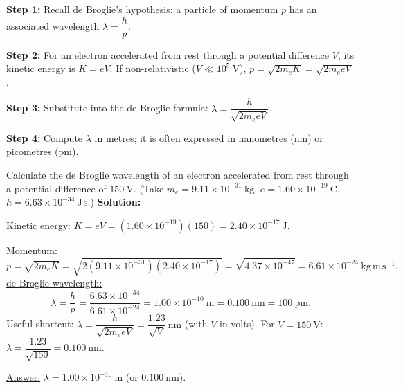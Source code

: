 \documentclass[11pt]{article}
\begin{document}
\begin{methode}
\textbf{Step 1:} Recall de Broglie's hypothesis: a particle of momentum $p$ has an associated wavelength $\lambda = \dfrac{h}{p}$.\par
\textbf{Step 2:} For an electron accelerated from rest through a potential difference $V$, its kinetic energy is $K = eV$. If non-relativistic ($V \ll 10^5\ \mathrm{V}$), $p = \sqrt{2m_e K} = \sqrt{2m_e eV}$.\par
\textbf{Step 3:} Substitute into the de Broglie formula: $\lambda = \dfrac{h}{\sqrt{2m_e eV}}$.\par
\textbf{Step 4:} Compute $\lambda$ in metres; it is often expressed in nanometres (nm) or picometres (pm).
\end{methode}

\begin{exoresolu}
Calculate the de Broglie wavelength of an electron accelerated from rest through a potential difference of $150\ \mathrm{V}$. (Take $m_e = 9.11\times10^{-31}\ \mathrm{kg}$, $e = 1.60\times10^{-19}\ \mathrm{C}$, $h = 6.63\times10^{-34}\ \mathrm{J\,s}$.)
\tcblower
\textbf{Solution:}\par
\underline{Kinetic energy:} $K = eV = (1.60\times10^{-19})(150) = 2.40\times10^{-17}\ \mathrm{J}$.\par
\underline{Momentum:}
\[
p = \sqrt{2m_e K} = \sqrt{2(9.11\times10^{-31})(2.40\times10^{-17})} = \sqrt{4.37\times10^{-47}} = 6.61\times10^{-24}\ \mathrm{kg\,m\,s^{-1}}.
\]
\underline{de Broglie wavelength:}
\[
\lambda = \frac{h}{p} = \frac{6.63\times10^{-34}}{6.61\times10^{-24}} = 1.00\times10^{-10}\ \mathrm{m} = 0.100\ \mathrm{nm} = 100\ \mathrm{pm}.
\]
\underline{Useful shortcut:} $\lambda = \dfrac{h}{\sqrt{2m_e eV}} = \dfrac{1.23}{\sqrt{V}}\ \mathrm{nm}$ (with $V$ in volts). For $V = 150\ \mathrm{V}$: $\lambda = \dfrac{1.23}{\sqrt{150}} = 0.100\ \mathrm{nm}$.\par
\underline{Answer:} $\lambda = 1.00\times10^{-10}\ \mathrm{m}$ (or $0.100\ \mathrm{nm}$).
\end{exoresolu}
\end{document}
